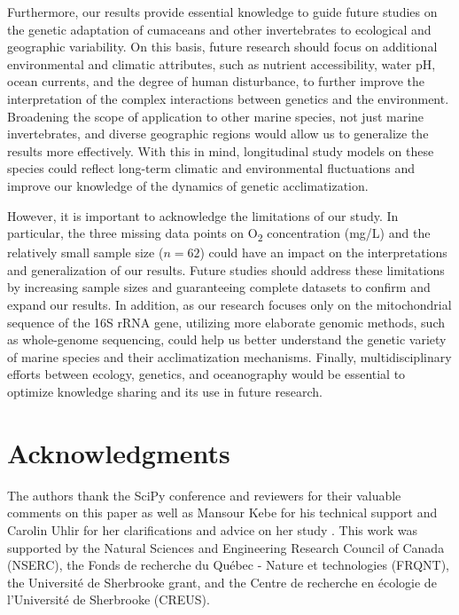 Furthermore, our results provide essential knowledge to guide future studies on the genetic adaptation of cumaceans and other invertebrates to ecological and geographic variability. On this basis, future research should focus on additional environmental and climatic attributes, such as nutrient accessibility, water pH, ocean currents, and the degree of human disturbance, to further improve the interpretation of the complex interactions between genetics and the environment. Broadening the scope of application to other marine species, not just marine invertebrates, and diverse geographic regions would allow us to generalize the results more effectively. With this in mind, longitudinal study models on these species could reflect long-term climatic and environmental fluctuations and improve our knowledge of the dynamics of genetic acclimatization.

However, it is important to acknowledge the limitations of our study. In particular, the three missing data points on O\textsubscript{2} concentration (mg/L) and the relatively small sample size ($n=62$) could have an impact on the interpretations and generalization of our results. Future studies should address these limitations by increasing sample sizes and guaranteeing complete datasets to confirm and expand our results. In addition, as our research focuses only on the mitochondrial sequence of the 16S rRNA gene, utilizing more elaborate genomic methods, such as whole-genome sequencing, could help us better understand the genetic variety of marine species and their acclimatization mechanisms. Finally, multidisciplinary efforts between ecology, genetics, and oceanography would be essential to optimize knowledge sharing and its use in future research.

\section{Acknowledgments}\label{acknowledgments}
The authors thank the SciPy conference and reviewers for their valuable comments on this paper as well as Mansour Kebe for his technical support and Carolin Uhlir for her clarifications and advice on her study \citep{uhlir_adding_2021}. This work was supported by the Natural Sciences and Engineering Research Council of Canada (NSERC), the Fonds de recherche du Québec - Nature et technologies (FRQNT), the Université de Sherbrooke grant, and the Centre de recherche en écologie de l’Université de Sherbrooke (CREUS).
